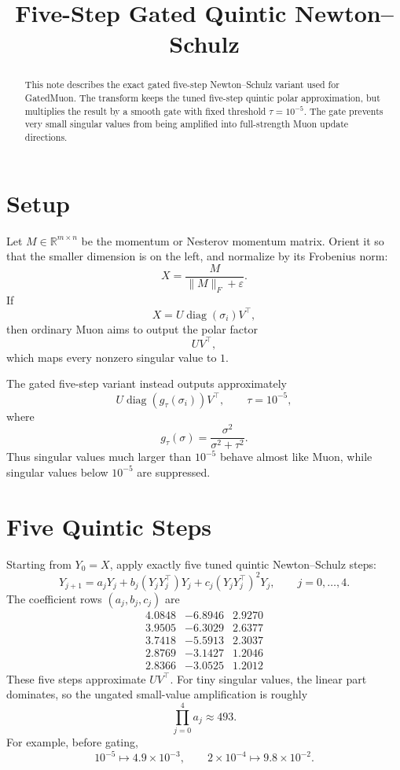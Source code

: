 \documentclass{article}
\title{Five-Step Gated Quintic Newton--Schulz}
\author{}
\date{}
\begin{document}
\maketitle

\begin{abstract}
This note describes the exact gated five-step Newton--Schulz variant used for
GatedMuon. The transform keeps the tuned five-step quintic polar approximation,
but multiplies the result by a smooth gate with fixed threshold
\(\tau=10^{-5}\). The gate prevents very small singular values from being
amplified into full-strength Muon update directions.
\end{abstract}

\section{Setup}

Let \(M \in \mathbb{R}^{m\times n}\) be the momentum or Nesterov momentum
matrix. Orient it so that the smaller dimension is on the left, and normalize
by its Frobenius norm:
\[
    X = \frac{M}{\|M\|_F+\varepsilon}.
\]
If
\[
    X = U \operatorname{diag}(\sigma_i) V^\top,
\]
then ordinary Muon aims to output the polar factor
\[
    U V^\top,
\]
which maps every nonzero singular value to \(1\).

The gated five-step variant instead outputs approximately
\[
    U \operatorname{diag}\!\left(g_\tau(\sigma_i)\right) V^\top,
    \qquad
    \tau = 10^{-5},
\]
where
\[
    g_\tau(\sigma)
    =
    \frac{\sigma^2}{\sigma^2+\tau^2}.
\]
Thus singular values much larger than \(10^{-5}\) behave almost like Muon,
while singular values below \(10^{-5}\) are suppressed.

\section{Five Quintic Steps}

Starting from \(Y_0=X\), apply exactly five tuned quintic Newton--Schulz steps:
\[
    Y_{j+1}
    =
    a_jY_j
    +
    b_j(Y_jY_j^\top)Y_j
    +
    c_j(Y_jY_j^\top)^2Y_j,
    \qquad
    j=0,\ldots,4.
\]
The coefficient rows \((a_j,b_j,c_j)\) are
\[
\begin{array}{ccc}
4.0848 & -6.8946 & 2.9270\\
3.9505 & -6.3029 & 2.6377\\
3.7418 & -5.5913 & 2.3037\\
2.8769 & -3.1427 & 1.2046\\
2.8366 & -3.0525 & 1.2012
\end{array}
\]
These five steps approximate \(UV^\top\). For tiny singular values, the
linear part dominates, so the ungated small-value amplification is roughly
\[
    \prod_{j=0}^4 a_j \approx 493.
\]
For example, before gating,
\[
    10^{-5} \mapsto 4.9\times 10^{-3},
    \qquad
    2\times 10^{-4} \mapsto 9.8\times 10^{-2}.
\]
\end{document}
